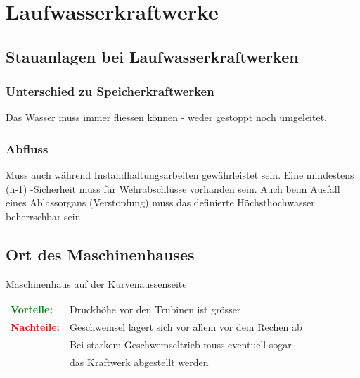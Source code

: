 \section{Laufwasserkraftwerke}
\subsection{Stauanlagen bei Laufwasserkraftwerken}
\subsubsection{Unterschied zu Speicherkraftwerken}
Das Wasser muss immer fliessen können - weder gestoppt noch umgeleitet.

\subsubsection{Abfluss}
Muss auch während Instandhaltungsarbeiten gewährleistet sein. Eine mindestens (n-1) -Sicherheit muss für Wehrabschlüsse vorhanden sein.
Auch beim Ausfall eines Ablassorgans (Verstopfung) muss das definierte Höchsthochwasser beherrschbar sein.

\subsection{Ort des Maschinenhauses}
Maschinenhaus auf der Kurvenaussenseite

\begin{tabular}{@{}ll}
    \textbf{\textcolor{green}{Vorteile:}} & Druckhöhe vor den Trubinen ist grösser\\
    \textbf{\textcolor{red}{Nachteile:}}  & Geschwemsel lagert sich vor allem vor dem Rechen ab \\
    & Bei starkem Geschwemseltrieb muss eventuell sogar \\
    & das Kraftwerk abgestellt werden \\
\end{tabular}



